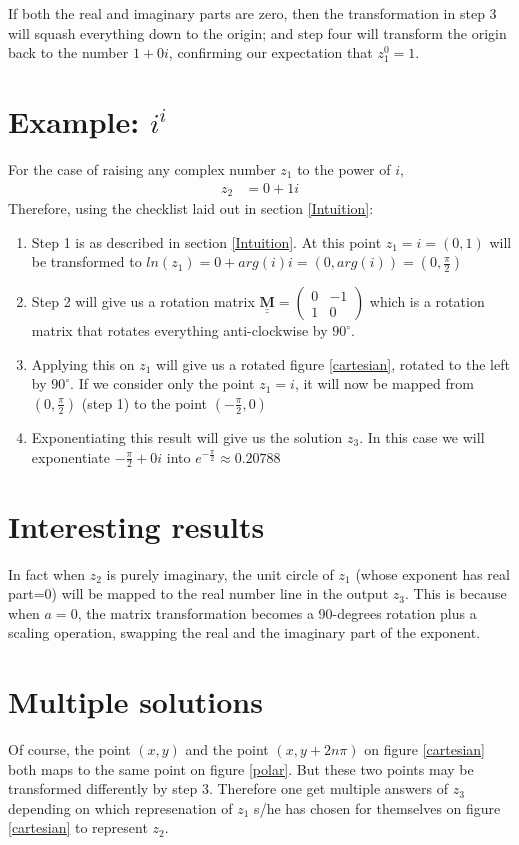 \documentclass[a4paper, 12pt]{article}
\newcommand{\matr}[1]{\underline{\underline{\textbf{#1}}}}
\begin{document}
If both the real and imaginary parts are zero, then the transformation in step 3 will squash everything down to the origin; and step four will transform the origin back to the number $1+0i$, confirming our expectation that $z_1^0 = 1$.

\section{Example: $i^i$}
For the case of raising any complex number $z_1$ to the power of $i$,
\begin{align}
    z_2 &= 0 + 1i
\end{align}
Therefore, using the checklist laid out in section \ref{Intuition}:

\begin{enumerate}
    \item Step 1 is as described in section \ref{Intuition}. At this point $z_1 = i = (0,1)$ will be transformed to $ln(z_1) = 0+arg(i) i = (0, arg(i)) = (0, \frac{\pi}{2})$
    \item Step 2 will give us a rotation matrix 
$\matr{M} = \begin{pmatrix}
0 & -1\\
1 & 0
\end{pmatrix}$ which is a rotation matrix that rotates everything anti-clockwise by $90 ^\circ$.
    \item Applying this on $z_1$ will give us a rotated figure \ref{cartesian}, rotated to the left by $90^\circ$. If we consider only the point $z_1 = i$, it will now be mapped from $(0, \frac{\pi}{2})$ (step 1) to the point $(-\frac{\pi}{2}, 0)$
    \item Exponentiating this result will give us the solution $z_3$. In this case we will exponentiate $-\frac{\pi}{2} + 0i$ into $e^{-\frac{\pi}{2}} \approx 0.20788$
\end{enumerate}

\section{Interesting results}
In fact when $z_2$ is purely imaginary, the unit circle of $z_1$ (whose exponent has real part=0) will be mapped to the real number line in the output $z_3$. This is because when $a=0$, the matrix transformation becomes a 90-degrees rotation plus a scaling operation, swapping the real and the imaginary part of the exponent.
\section{Multiple solutions}
Of course, the point $(x,y)$ and the point $(x, y + 2n\pi)$ on figure \ref{cartesian} both maps to the same point on figure \ref{polar}. But these two points may be transformed differently by step 3. Therefore one get multiple answers of $z_3$ depending on which represenation of $z_1$ s/he has chosen for themselves on figure \ref{cartesian} to represent $z_2$.
\end{document}
